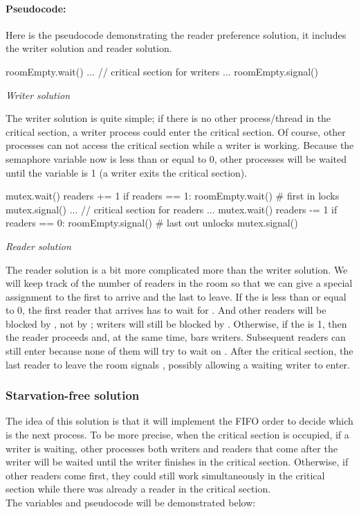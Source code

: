\documentclass[a4paper, 10pt]{article}
\begin{document}
\paragraph{Pseudocode:} Here is the pseudocode demonstrating the reader preference solution, it includes the writer solution and reader solution.  
\begin{mycodeblock}
roomEmpty.wait()
...
// critical section for writers
...
roomEmpty.signal()
\end{mycodeblock}
\begin{center}
    \textit{Writer solution}
\end{center}
The writer solution is quite simple; if there is no other process/thread in the critical section, a writer process could enter the critical section. Of course, other processes can not access the critical section while a writer is working. Because the semaphore variable {} now is less than or equal to 0, other processes will be waited until the variable is 1 (a writer exits the critical section). 
\begin{mycodeblock}
mutex.wait()
    readers += 1
    if readers == 1:
        roomEmpty.wait()      # first in locks
mutex.signal()
...
// critical section for readers
...
mutex.wait()
    readers -= 1
    if readers == 0:
        roomEmpty.signal()    # last out unlocks
mutex.signal()
\end{mycodeblock}
\begin{center}
    \textit{Reader solution}
\end{center}
The reader solution is a bit more complicated more than the writer solution. We will keep track of the number of readers in the room so that we can give a special assignment to the first to arrive and the last to leave.  If the {} is less than or equal to 0, the first reader that arrives has to wait for {}. And other readers will be blocked by {}, not by {}; writers will still be blocked by {}. Otherwise, if the {} is 1,
then the reader proceeds and, at the same time, bars writers. Subsequent readers
can still enter because none of them will try to wait on {}. After the critical section, the last reader to leave the
room signals {}, possibly allowing a
waiting writer to enter.
\subsubsection{Starvation-free solution}
\quad The idea of this solution is that it will implement the FIFO order to decide which is the next process. To be more precise, when the critical section is occupied, if a writer is waiting, other processes both writers and readers that come after the writer will be waited until the writer finishes in the critical section.  Otherwise, if other readers come first, they could still work simultaneously in the critical section while there was already a reader in the critical section.\\
\hspace*{1em}The variables and pseudocode will be demonstrated below: 
\end{document}
